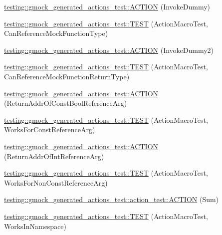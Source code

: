 \begin{DoxyCompactItemize}
\item 
\hyperlink{namespacetesting_1_1gmock__generated__actions__test_ae6806220035fcf097362dd736db4b03b}{testing\+::gmock\+\_\+generated\+\_\+actions\+\_\+test\+::\+A\+C\+T\+I\+ON} (Invoke\+Dummy)
\item 
\hyperlink{namespacetesting_1_1gmock__generated__actions__test_a1d3b8bb25c79d7e2167234f87935ea1e}{testing\+::gmock\+\_\+generated\+\_\+actions\+\_\+test\+::\+T\+E\+ST} (Action\+Macro\+Test, Can\+Reference\+Mock\+Function\+Type)
\item 
\hyperlink{namespacetesting_1_1gmock__generated__actions__test_a9f274ffcf4211cb03b4390cb0cc1ef1c}{testing\+::gmock\+\_\+generated\+\_\+actions\+\_\+test\+::\+A\+C\+T\+I\+ON} (Invoke\+Dummy2)
\item 
\hyperlink{namespacetesting_1_1gmock__generated__actions__test_a384a114235b474bb4318754e0d16f559}{testing\+::gmock\+\_\+generated\+\_\+actions\+\_\+test\+::\+T\+E\+ST} (Action\+Macro\+Test, Can\+Reference\+Mock\+Function\+Return\+Type)
\item 
\hyperlink{namespacetesting_1_1gmock__generated__actions__test_a78725817afcd5d7f19df2bdc2d41b9db}{testing\+::gmock\+\_\+generated\+\_\+actions\+\_\+test\+::\+A\+C\+T\+I\+ON} (Return\+Addr\+Of\+Const\+Bool\+Reference\+Arg)
\item 
\hyperlink{namespacetesting_1_1gmock__generated__actions__test_a8b4dadfc32c71e754d6ba3daae382715}{testing\+::gmock\+\_\+generated\+\_\+actions\+\_\+test\+::\+T\+E\+ST} (Action\+Macro\+Test, Works\+For\+Const\+Reference\+Arg)
\item 
\hyperlink{namespacetesting_1_1gmock__generated__actions__test_aeb01205293078272696bd0c19ce4e848}{testing\+::gmock\+\_\+generated\+\_\+actions\+\_\+test\+::\+A\+C\+T\+I\+ON} (Return\+Addr\+Of\+Int\+Reference\+Arg)
\item 
\hyperlink{namespacetesting_1_1gmock__generated__actions__test_a093a824ac7e8ec775a8f5d7b11d223a9}{testing\+::gmock\+\_\+generated\+\_\+actions\+\_\+test\+::\+T\+E\+ST} (Action\+Macro\+Test, Works\+For\+Non\+Const\+Reference\+Arg)
\item 
\hyperlink{namespacetesting_1_1gmock__generated__actions__test_1_1action__test_a78d00ea4fff98d5cd3f73f8f03800bbe}{testing\+::gmock\+\_\+generated\+\_\+actions\+\_\+test\+::action\+\_\+test\+::\+A\+C\+T\+I\+ON} (Sum)
\item 
\hyperlink{namespacetesting_1_1gmock__generated__actions__test_af75a9a5b9d6a1cf718a58f030a5a9133}{testing\+::gmock\+\_\+generated\+\_\+actions\+\_\+test\+::\+T\+E\+ST} (Action\+Macro\+Test, Works\+In\+Namespace)

\end{DoxyCompactItemize}
